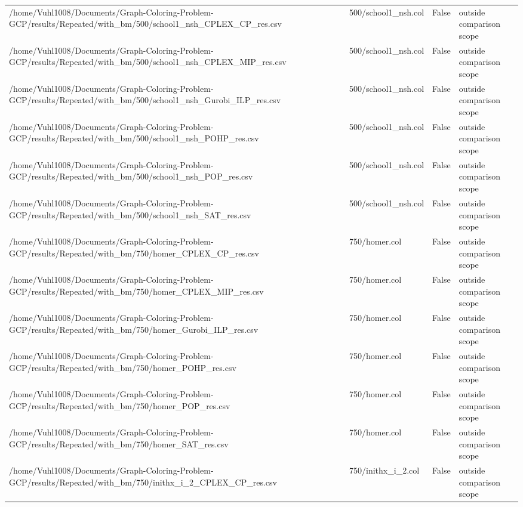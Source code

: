 \begin{table}[htbp]
\begin{tabular}{llll}
/home/Vuhl1008/Documents/Graph-Coloring-Problem-GCP/results/Repeated/with\_bm/500/school1\_nsh\_CPLEX\_CP\_res.csv & 500/school1\_nsh.col & False & outside comparison scope \\
/home/Vuhl1008/Documents/Graph-Coloring-Problem-GCP/results/Repeated/with\_bm/500/school1\_nsh\_CPLEX\_MIP\_res.csv & 500/school1\_nsh.col & False & outside comparison scope \\
/home/Vuhl1008/Documents/Graph-Coloring-Problem-GCP/results/Repeated/with\_bm/500/school1\_nsh\_Gurobi\_ILP\_res.csv & 500/school1\_nsh.col & False & outside comparison scope \\
/home/Vuhl1008/Documents/Graph-Coloring-Problem-GCP/results/Repeated/with\_bm/500/school1\_nsh\_POHP\_res.csv & 500/school1\_nsh.col & False & outside comparison scope \\
/home/Vuhl1008/Documents/Graph-Coloring-Problem-GCP/results/Repeated/with\_bm/500/school1\_nsh\_POP\_res.csv & 500/school1\_nsh.col & False & outside comparison scope \\
/home/Vuhl1008/Documents/Graph-Coloring-Problem-GCP/results/Repeated/with\_bm/500/school1\_nsh\_SAT\_res.csv & 500/school1\_nsh.col & False & outside comparison scope \\
/home/Vuhl1008/Documents/Graph-Coloring-Problem-GCP/results/Repeated/with\_bm/750/homer\_CPLEX\_CP\_res.csv & 750/homer.col & False & outside comparison scope \\
/home/Vuhl1008/Documents/Graph-Coloring-Problem-GCP/results/Repeated/with\_bm/750/homer\_CPLEX\_MIP\_res.csv & 750/homer.col & False & outside comparison scope \\
/home/Vuhl1008/Documents/Graph-Coloring-Problem-GCP/results/Repeated/with\_bm/750/homer\_Gurobi\_ILP\_res.csv & 750/homer.col & False & outside comparison scope \\
/home/Vuhl1008/Documents/Graph-Coloring-Problem-GCP/results/Repeated/with\_bm/750/homer\_POHP\_res.csv & 750/homer.col & False & outside comparison scope \\
/home/Vuhl1008/Documents/Graph-Coloring-Problem-GCP/results/Repeated/with\_bm/750/homer\_POP\_res.csv & 750/homer.col & False & outside comparison scope \\
/home/Vuhl1008/Documents/Graph-Coloring-Problem-GCP/results/Repeated/with\_bm/750/homer\_SAT\_res.csv & 750/homer.col & False & outside comparison scope \\
/home/Vuhl1008/Documents/Graph-Coloring-Problem-GCP/results/Repeated/with\_bm/750/inithx\_i\_2\_CPLEX\_CP\_res.csv & 750/inithx\_i\_2.col & False & outside comparison scope \\

\end{tabular}
\end{table}
